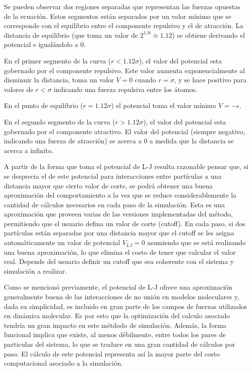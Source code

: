 Se pueden observar dos regiones separadas que representan las fuerzas opuestas de la ecuación. 
Estos segmentos están separados por un valor mínimo que se corresponde con el equilibrio entre el componente repulsivo y el de atracción. 
La distancia de equilibrio (que toma un valor de $2^{1/6}\approx1.12$) se obtiene derivando el potencial e igualándolo a 0.

En el primer segmento de la curva ($r<1.12\sigma$), el valor del potencial esta gobernado por el componente repulsivo. 
Este valor aumenta exponencialmente al disminuir la distancia, toma un valor $V=0$ cuando $r=\sigma$, y se hace positivo para valores de $r<\sigma$ indicando una fuerza repulsiva entre los átomos.

En el punto de equilibrio ($r=1.12\sigma$) el potencial toma el valor mínimo $V=-\epsilon$.

En el segundo segmento de la curva ($r>1.12\sigma$), el valor del potencial esta gobernado por el componente atractivo. El valor del potencial (siempre negativo, indicando una fuerza de atracción) se acerca a 0 a medida que la distancia se acerca a infinito. 


A partir de la forma que toma el potencial de L-J resulta razonable pensar que, si se desprecia el de este potencial para interacciones entre partículas a una distancia mayor que cierto valor de corte, se podrá obtener una buena aproximación del comportamiento a la vez que se reduce considerablemente la cantidad de cálculos necesarios en cada paso de la simulación.
Esta es una aproximación que proveen varias de las versiones implementadas del método, permitiendo que el usuario defina un valor de corte (cutoff). 
En cada paso, si dos partículas están separadas por una distancia mayor que el cutoff se les asigna automáticamente un valor de potencial $V_{LJ}=0$ asumiendo que se está realizando una buena aproximación, lo que elimina el costo de tener que calcular el valor real. 
Depende del usuario definir un cutoff que sea coherente con el sistema y simulación a realizar.

Como se mencionó previamente, el potencial de L-J ofrece una aproximación generalmente buena de las interacciones de no unión en modelos moleculares y, dada su simplicidad, es incluido en gran parte de los campos de fuerzas utilizados en dinámica molecular.
Es por esto que la optimización del calculo asociado tendría un gran impacto en este métdodo de simulación. Además, la forma funcional implica que existe, al menos débilmente, entre todos los pares de particulas del sistema, lo que se traduce en una gran cantidad de cálculos por paso. 
El cálculo de este potencial representa así la mayor parte del costo computacional asociado a la simulación. 


